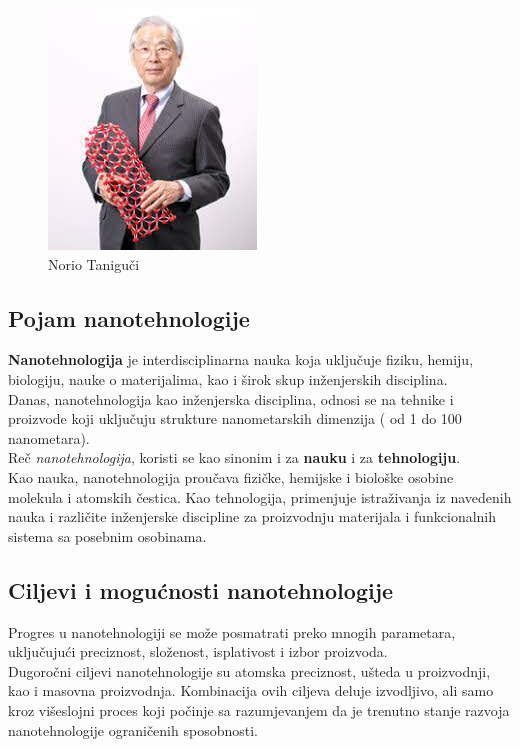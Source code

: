 \documentclass[a4paper]{article}
\begin{document}
{\begin{figure}[H]
    \centering
    \includegraphics[width=.4\textwidth]{slika 1.jpg}
    \caption{Norio Taniguči}
    \label{slika_Norio}
\end{figure}

\subsection{Pojam nanotehnologije}
\textbf{Nanotehnologija} \cite{prviLink} je interdisciplinarna nauka koja uključuje fiziku, hemiju, biologiju, nauke o materijalima, kao i širok skup inženjerskih disciplina.\\ 
Danas, nanotehnologija kao inženjerska disciplina, odnosi se na tehnike i proizvode koji uključuju strukture nanometarskih dimenzija ( od 1 do 100 nanometara).\\  Reč \textit{nanotehnologija}, koristi se kao sinonim i za \textbf{nauku} i za \textbf{tehnologiju}.\\ 
Kao nauka, nanotehnologija proučava fizičke, hemijske i biološke osobine molekula i atomskih čestica. Kao tehnologija, primenjuje istraživanja iz navedenih nauka i različite inženjerske discipline za proizvodnju materijala i funkcionalnih sistema sa posebnim osobinama.

\subsection{Ciljevi i mogućnosti nanotehnologije}
Progres u nanotehnologiji se može posmatrati preko mnogih parametara, uključujući preciznost, složenost, isplativost i izbor proizvoda.\\ 
Dugoročni ciljevi nanotehnologije su atomska preciznost, ušteda u proizvodnji, kao i masovna proizvodnja. Kombinacija ovih ciljeva deluje izvodljivo, ali samo kroz višeslojni proces koji počinje sa razumjevanjem da je trenutno stanje razvoja nanotehnologije ograničenih sposobnosti.

}
\end{document}
